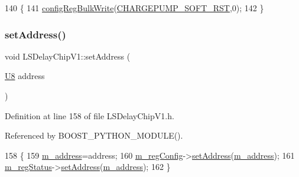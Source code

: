 \begin{DoxyCode}
140 \{
141     \hyperlink{classLSDelayChipV1_afa626b5d52f8723bcaa3205d1cc7a0f8}{configRegBulkWrite}(\hyperlink{LSDelayChipV1_8h_a08aff1d45994f410f4f4a6e7e9a13db9}{CHARGEPUMP\_SOFT\_RST},0);
142 \}
\end{DoxyCode}
\mbox{\label{classLSDelayChipV1_a04ec44c79258fd22f7d2d5ea27a67648}} 
\subsubsection{\texorpdfstring{set\+Address()}{setAddress()}}
{\footnotesize\ttfamily void L\+S\+Delay\+Chip\+V1\+::set\+Address (\begin{DoxyParamCaption}\item[{\hyperlink{ICECALv3_8h_a3cb25ca6f51f003950f9625ff05536fc}{U8}}]{address }\end{DoxyParamCaption})\hspace{0.3cm}{\ttfamily [inline]}}



Definition at line 158 of file L\+S\+Delay\+Chip\+V1.\+h.



Referenced by B\+O\+O\+S\+T\+\_\+\+P\+Y\+T\+H\+O\+N\+\_\+\+M\+O\+D\+U\+L\+E().


\begin{DoxyCode}
158                              \{
159     \hyperlink{classLSDelayChipV1_a6fba278fd2ac602c796b5e5cebf2d2de}{m\_address}=address;
160     \hyperlink{classLSDelayChipV1_afd1cfdcb114549dc1466c77f07d39fe0}{m\_regConfig}->\hyperlink{classIOobject_ae0d372aaeafe3da3c239677118deb2ac}{setAddress}(\hyperlink{classLSDelayChipV1_a6fba278fd2ac602c796b5e5cebf2d2de}{m\_address});
161     \hyperlink{classLSDelayChipV1_aaf118f103e89a35d2c449e8e3ffe8c20}{m\_regStatus}->\hyperlink{classIOobject_ae0d372aaeafe3da3c239677118deb2ac}{setAddress}(\hyperlink{classLSDelayChipV1_a6fba278fd2ac602c796b5e5cebf2d2de}{m\_address});
162   \}
\end{DoxyCode}
\mbox{\label{classLSDelayChipV1_a11fa2ebfa37c5cf0544ddb68c7d43e94}} 
